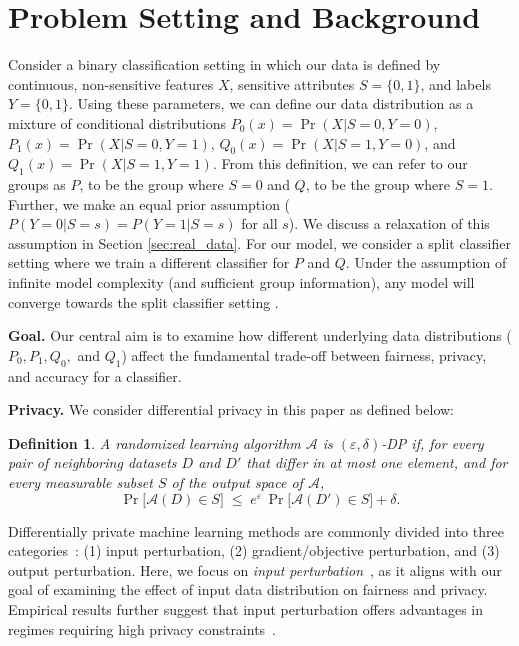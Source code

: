 \documentclass[11pt,letterpaper]{article}
\newtheorem{definition}{Definition}
\begin{document}
\section{Problem Setting and Background}



 Consider a binary classification setting in which our data is defined by continuous, non-sensitive features $X$, sensitive attributes $S = \{0,1\}$, and labels $Y = \{0, 1\}$. Using these parameters, we can define our data distribution as a mixture of conditional distributions $P_0(x) = \Pr(X|S = 0, Y=0)$, $P_1(x) = \Pr(X|S = 0, Y=1)$, $Q_0(x) = \Pr(X|S = 1, Y=0)$, and $Q_1(x) = \Pr(X|S = 1, Y=1)$. From this definition, we can refer to our groups as $P$, to be the group where $S=0$ and $Q$, to be the group where $S=1$. Further, we make an equal prior assumption ($P(Y=0| S = s) = P(Y=1|S = s)$ for all $s$). We discuss a relaxation of this assumption in Section \ref{sec:real_data}.  For our model, we consider a split classifier setting where we train a different classifier for $P$ and $Q$. Under the assumption of infinite model complexity (and sufficient group information), any model will converge towards the split classifier setting \citep{wang2021split}. 


 \textbf{Goal.} Our central aim is to examine how different underlying data distributions ($P_0, P_1, Q_0,$ and $Q_1$) affect the fundamental trade-off between fairness, privacy, and accuracy for a classifier.

\textbf{Privacy.} We consider differential privacy in this paper as defined below: 


\begin{definition}
     A randomized learning algorithm \(\mathcal{A}\) is \((\varepsilon,\delta)\)-DP if, for every pair of neighboring datasets \(D\) and \(D'\) that differ in at most one element, and for every measurable subset \(S\) of the output space of \(\mathcal{A}\),
\begin{equation}
\Pr\!\bigl[\mathcal{A}(D) \in S\bigr]
\;\le\;
e^{\varepsilon}\,
\Pr\!\bigl[\mathcal{A}(D') \in S\bigr]
+
\delta.
\end{equation}
\end{definition}
Differentially private machine learning methods are commonly divided into three categories~\citep{jarin2022dp}: (1) input perturbation, (2) gradient/objective perturbation, and (3) output perturbation. Here, we focus on \textit{input perturbation}~\citep{fukuchi2017differentially,kang2020inputperturbationnewparadigm}, as it aligns with our goal of examining the effect of input data distribution on fairness and privacy. Empirical results further suggest that input perturbation offers advantages in regimes requiring high privacy constraints~\citep{zhao2020not}.
\end{document}
